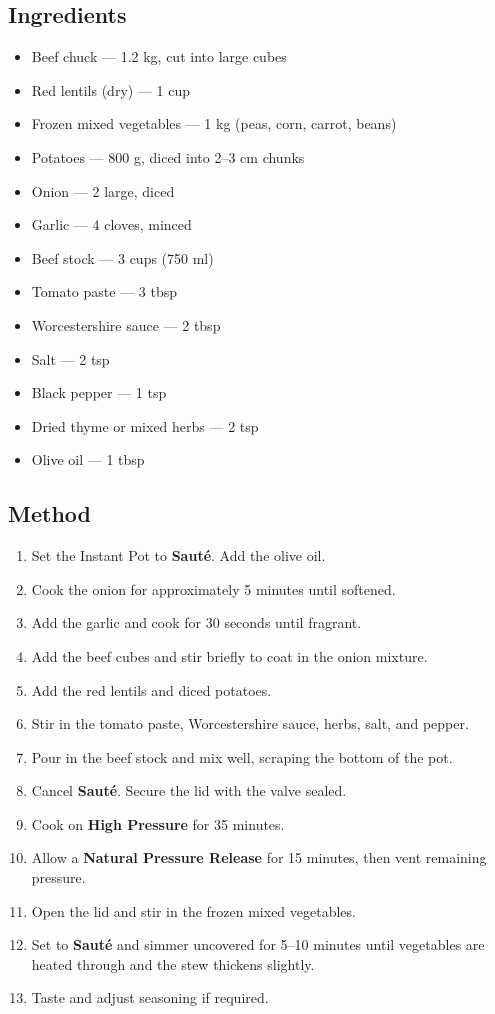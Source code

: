 \documentclass[11pt,a4paper]{article}
\begin{document}
\subsection*{Ingredients}
\begin{itemize}
    \item Beef chuck — 1.2 kg, cut into large cubes
    \item Red lentils (dry) — 1 cup
    \item Frozen mixed vegetables — 1 kg (peas, corn, carrot, beans)
    \item Potatoes — 800 g, diced into 2--3 cm chunks
    \item Onion — 2 large, diced
    \item Garlic — 4 cloves, minced
    \item Beef stock — 3 cups (750 ml)
    \item Tomato paste — 3 tbsp
    \item Worcestershire sauce — 2 tbsp
    \item Salt — 2 tsp
    \item Black pepper — 1 tsp
    \item Dried thyme or mixed herbs — 2 tsp
    \item Olive oil — 1 tbsp
\end{itemize}

\vspace{0.5em}

\subsection*{Method}
\begin{enumerate}
    \item Set the Instant Pot to \textbf{Sauté}. Add the olive oil.
    \item Cook the onion for approximately 5 minutes until softened.
    \item Add the garlic and cook for 30 seconds until fragrant.
    \item Add the beef cubes and stir briefly to coat in the onion mixture.
    \item Add the red lentils and diced potatoes.
    \item Stir in the tomato paste, Worcestershire sauce, herbs, salt, and pepper.
    \item Pour in the beef stock and mix well, scraping the bottom of the pot.
    \item Cancel \textbf{Sauté}. Secure the lid with the valve sealed.
    \item Cook on \textbf{High Pressure} for 35 minutes.
    \item Allow a \textbf{Natural Pressure Release} for 15 minutes, then vent remaining pressure.
    \item Open the lid and stir in the frozen mixed vegetables.
    \item Set to \textbf{Sauté} and simmer uncovered for 5--10 minutes until vegetables are heated through and the stew thickens slightly.
    \item Taste and adjust seasoning if required.
\end{enumerate}
\end{document}
